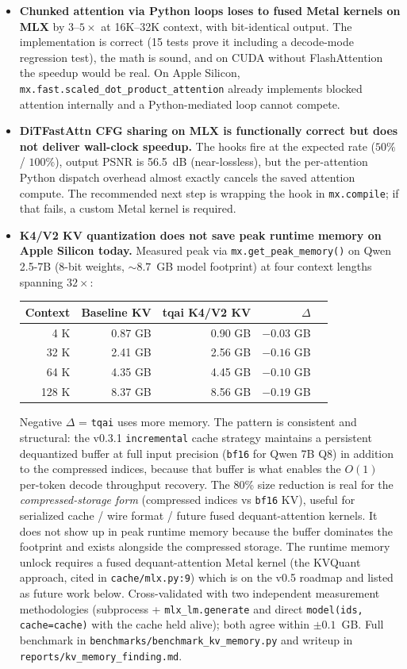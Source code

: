 \documentclass[11pt,a4paper]{article}
\begin{document}
\begin{itemize}
  \item \textbf{Chunked attention via Python loops loses to fused Metal kernels on MLX} by $3$--$5\times$ at 16K--32K context, with bit-identical output. The implementation is correct (15 tests prove it including a decode-mode regression test), the math is sound, and on CUDA without FlashAttention the speedup would be real. On Apple Silicon, \texttt{mx.fast.scaled\_dot\_product\_attention} already implements blocked attention internally and a Python-mediated loop cannot compete.
  \item \textbf{DiTFastAttn CFG sharing on MLX is functionally correct but does not deliver wall-clock speedup.} The hooks fire at the expected rate ($50\%$ / $100\%$), output PSNR is 56.5~dB (near-lossless), but the per-attention Python dispatch overhead almost exactly cancels the saved attention compute. The recommended next step is wrapping the hook in \texttt{mx.compile}; if that fails, a custom Metal kernel is required.
  \item \textbf{K4/V2 KV quantization does not save peak runtime memory on Apple Silicon today.} Measured peak via \texttt{mx.get\_peak\_memory()} on Qwen 2.5-7B (8-bit weights, $\sim 8.7$~GB model footprint) at four context lengths spanning $32\times$:
  \begin{center}
  \small
  \begin{tabular}{rrrrr}
  \toprule
  Context & Baseline KV & tqai K4/V2 KV & $\Delta$ \\
  \midrule
  4 K   & 0.87 GB & 0.90 GB & $-0.03$ GB \\
  32 K  & 2.41 GB & 2.56 GB & $-0.16$ GB \\
  64 K  & 4.35 GB & 4.45 GB & $-0.10$ GB \\
  128 K & 8.37 GB & 8.56 GB & $-0.19$ GB \\
  \bottomrule
  \end{tabular}
  \end{center}
  Negative $\Delta$ = \texttt{tqai} uses more memory. The pattern is consistent and structural: the v0.3.1 \texttt{incremental} cache strategy maintains a persistent dequantized buffer at full input precision (\texttt{bf16} for Qwen 7B Q8) in addition to the compressed indices, because that buffer is what enables the $O(1)$ per-token decode throughput recovery. The 80\% size reduction is real for the \emph{compressed-storage form} (compressed indices vs \texttt{bf16} KV), useful for serialized cache / wire format / future fused dequant-attention kernels. It does not show up in peak runtime memory because the buffer dominates the footprint and exists alongside the compressed storage. The runtime memory unlock requires a fused dequant-attention Metal kernel (the KVQuant approach, cited in \texttt{cache/mlx.py:9}) which is on the v0.5 roadmap and listed as future work below. Cross-validated with two independent measurement methodologies (subprocess + \texttt{mlx\_lm.generate} and direct \texttt{model(ids, cache=cache)} with the cache held alive); both agree within $\pm 0.1$~GB. Full benchmark in \texttt{benchmarks/benchmark\_kv\_memory.py} and writeup in \texttt{reports/kv\_memory\_finding.md}.
\end{itemize}
\end{document}
